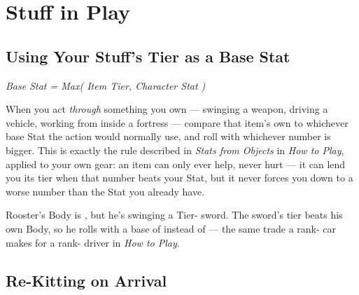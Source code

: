\section{Stuff in Play}

\subsection*{Using Your Stuff's Tier as a Base Stat}
\begin{center}
{\Large\itshape Base Stat = Max( Item Tier, Character Stat )}
\end{center}

When you act \emph{through} something you own --- swinging a weapon,
driving a vehicle, working from inside a fortress --- compare that
item's own  to whichever base Stat the action would
normally use, and roll with whichever number is bigger. This is exactly
the rule described in \emph{Stats from Objects} in \emph{How to Play},
applied to your own gear: an item can only ever help, never hurt --- it
can lend you its tier when that number beats your Stat, but it never
forces you down to a worse number than the Stat you already have.

\begin{example}
Rooster's Body is , but he's swinging a Tier- sword.
The sword's tier beats his own Body, so he rolls with a base of 
instead of  --- the same trade a rank- car makes for a
rank- driver in \emph{How to Play}.
\end{example}

\subsection*{Re-Kitting on Arrival}

